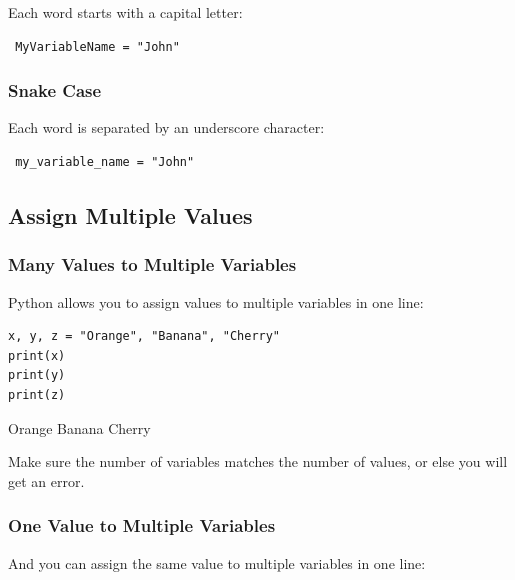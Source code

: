 \documentclass[12pt,a4paper]{article}
\begin{document}
Each word starts with a capital letter:

\begin{ebox}
	\begin{lstlisting}
 MyVariableName = "John"
	\end{lstlisting}
\end{ebox}

\subsubsection{Snake Case}

Each word is separated by an underscore character:

\begin{ebox}
	\begin{lstlisting}
 my_variable_name = "John"
	\end{lstlisting}
\end{ebox}
\subsection{Assign Multiple Values}

\subsubsection{Many Values to Multiple Variables}

Python allows you to assign values to multiple variables in one line:

\begin{ebox}
	\begin{lstlisting}
x, y, z = "Orange", "Banana", "Cherry"
print(x)
print(y)
print(z)
	\end{lstlisting}
\tcblower
	\begin{vercode}
Orange
Banana
Cherry
	\end{vercode}
\end{ebox}

\begin{nbox}
	Make sure the number of variables matches the number of values, or else you
	will get an error.
\end{nbox}
\subsubsection{One Value to Multiple Variables}

And you can assign the same value to multiple variables in one line:
\end{document}

